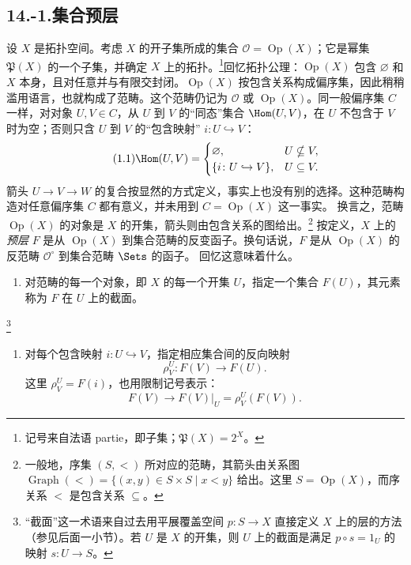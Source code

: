 \subsection*{14.-1.\quad 集合预层}
设 $X$ 是拓扑空间。考虑 $X$ 的开子集所成的集合 $\mathcal O=\operatorname{Op}(X)$；它是幂集 $\mathfrak P(X)$ 的一个子集，并确定 $X$ 上的拓扑。\footnote{记号来自法语 partie，即子集；$\mathfrak P(X)=2^X$。}回忆拓扑公理：$\operatorname{Op}(X)$ 包含 $\varnothing$ 和 $X$ 本身，且对任意并与有限交封闭。$\operatorname{Op}(X)$ 按包含关系构成偏序集，因此稍稍滥用语言，也就构成了范畴。这个范畴仍记为 $\mathcal O$ 或 $\operatorname{Op}(X)$。同一般偏序集 $C$ 一样，对对象 $U,V\in C$，从 $U$ 到 $V$ 的“同态”集合 $\Hom(U,V)$，在 $U$ 不包含于 $V$ 时为空；否则只含 $U$ 到 $V$ 的“包含映射” $i\colon U\hookrightarrow V$：
\begin{equation}\tag{1.1}
 \Hom(U,V)=\begin{cases}
 \varnothing,&U\nsubseteq V,\\
 \{i\colon U\hookrightarrow V\},&U\subseteq V.
 \end{cases}
\end{equation}
箭头 $U\to V\to W$ 的复合按显然的方式定义，事实上也没有别的选择。这种范畴构造对任意偏序集 $C$ 都有意义，并未用到 $C=\operatorname{Op}(X)$ 这一事实。
换言之，范畴 $\operatorname{Op}(X)$ 的对象是 $X$ 的开集，箭头则由包含关系的图给出。\footnote{一般地，序集 $(S,<)$ 所对应的范畴，其箭头由关系图 $\operatorname{Graph}(<)=\{(x,y)\in S\times S\mid x<y\}$ 给出。这里 $S=\operatorname{Op}(X)$，而序关系 $<$ 是包含关系 $\subseteq$。}
按定义，$X$ 上的\emph{预层} $F$ 是从 $\operatorname{Op}(X)$ 到集合范畴的反变函子。换句话说，$F$ 是从 $\operatorname{Op}(X)$ 的反范畴 $\mathcal O^{\circ}$ 到集合范畴 $\Sets$ 的函子。
回忆这意味着什么。
\begin{enumerate}[label=\arabic*)]
\item 对范畴的每一个对象，即 $X$ 的每一个开集 $U$，指定一个集合 $F(U)$，其元素称为 $F$ 在 $U$ 上的截面。
\end{enumerate}
\footnote{“截面”这一术语来自过去用平展覆盖空间 $p\colon S\to X$ 直接定义 $X$ 上的层的方法（参见后面一小节）。若 $U$ 是 $X$ 的开集，则 $U$ 上的截面是满足 $p\circ s=1_U$ 的映射 $s\colon U\to S$。}
\begin{enumerate}[label=\arabic*),start=2]
\item 对每个包含映射 $i\colon U\hookrightarrow V$，指定相应集合间的反向映射
\begin{equation}\tag{1.2}
 \rho_V^U\colon F(V)\longrightarrow F(U).
\end{equation}
这里 $\rho_V^U=F(i)$，也用限制记号表示：
\begin{equation}\tag{1.3}
 F(V)\longrightarrow F(V)|_U=\rho_V^U(F(V)).
\end{equation}
\end{enumerate}
